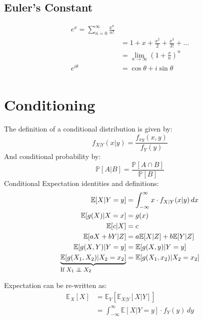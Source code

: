 \subsection{Euler's Constant}
\begin{equation*}
    \begin{aligned}
        e^x = \sum_{n=0}^{\infty} \frac{x^n}{n!}  \\
            &= 1 + x + \frac{x^2}{2} + \frac{x^3}{3!} + \dots \\
            &= \lim_{n\to\infty} \left(1 + \frac{x}{n} \right)^n \\
        e^{i\theta} &= \cos\theta + i\sin\theta \\
    \end{aligned}
\end{equation*}

\section{Conditioning}
The definition of a conditional distribution is given by:
\begin{equation*}
    f_{X|Y}(x|y) = \frac{f_{xy}(x, y)}{f_Y(y)}
\end{equation*}
And conditional probability by:
\begin{equation*}
    \mathbb{P}[A|B] = \frac{ \mathbb{P}[A \cap B]}{ \mathbb{P}[B] }
\end{equation*}
Conditional Expectation identities and definitions:
\begin{equation*}
    \begin{aligned}
        \mathbb{E}[X|Y=y] &= \int_{-\infty}^{\infty} x \cdot f_{X|Y}(x|y) \,dx \\
        \mathbb{E}[g(X)|X=x] &= g(x) \\
        \mathbb{E}[c | X] &= c \\
        \mathbb{E}[aX + bY | Z] &= a \mathbb{E}[X|Z] + b \mathbb{E}[Y|Z] \\
        \mathbb{E}[g(X, Y) | Y=y] &= \mathbb{E}[g(X, y) | Y=y] \\
        \explain{\mathbb{E}[g(X_1, X_2) | X_2=x_2]}{If $X_1 \indep X_2$} &= \mathbb{E}[g(X_1, x_2) | X_2=x_2] \\
    \end{aligned}
\end{equation*}

Expectation can be re-written as:
\begin{equation*}
    \begin{aligned}
        \mathbb{E}_X[X] &= \mathbb{E}_Y[ \mathbb{E}_{X|Y}[X|Y] ] \\
            &= \int_{-\infty}^{\infty} \mathbb{E}[X|Y=y] \cdot f_Y(y) \,dy \\
    \end{aligned}
\end{equation*}

